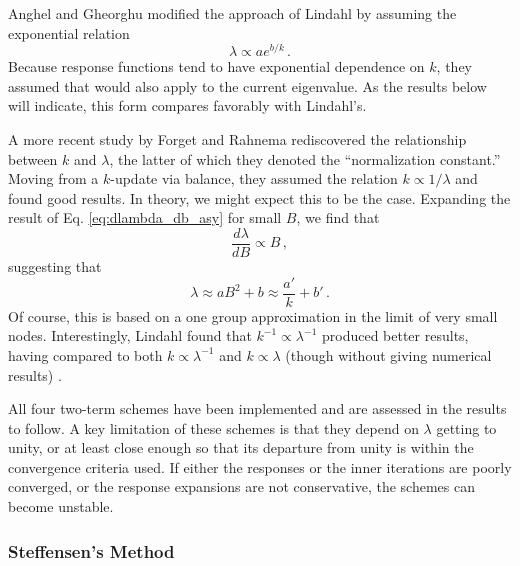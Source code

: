 Anghel and Gheorghu \cite{anghel1987isr}
modified the approach of Lindahl by assuming the 
exponential relation
\begin{equation}
  \lambda \propto a e^{b/k} \, .
\end{equation}
Because response functions tend to have exponential dependence on 
$k$, they assumed that would also apply to the current eigenvalue.  As the
results below will indicate, this form compares favorably with Lindahl's.

A more recent study by Forget and Rahnema \cite{forget2005nee} 
rediscovered the relationship
between $k$ and $\lambda$, the latter of which they denoted
the ``normalization constant.'' 
Moving from a $k$-update via balance, they assumed the relation 
$k \propto 1/\lambda$ and found good results.  In theory, we might expect 
this to be the case.  Expanding the result of Eq. \ref{eq:dlambda_db_asy}
for small $B$, we find that 
\begin{equation}
 \frac{d \lambda}{d B} \propto  B \, ,
\end{equation}
suggesting that 
\begin{equation}
 \lambda \approx  a B^2 + b \approx \frac{a'}{k} + b' \, .
\end{equation}
Of course, this is based on a one group approximation in the limit of 
very small nodes. Interestingly, Lindahl
found that $k^{-1} \propto \lambda^{-1}$ produced better results, having 
compared to both $k \propto \lambda^{-1}$ and $k \propto \lambda$ (though
without giving numerical results) \cite{lindahl1976mdr}.

All four two-term schemes have been implemented and are assessed in 
the results to follow.  A key limitation of these schemes is that they 
depend on $\lambda$ getting to unity, or at least close enough so that
its departure from unity is within the convergence criteria used.  If
either the responses or the inner iterations are poorly converged, or
the response expansions are not conservative, the 
schemes can become unstable.

\subsubsection{Steffensen's Method}
\label{sec:steffensensmethod}

